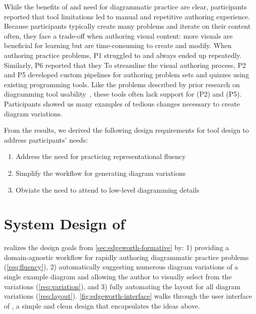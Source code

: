 While the benefits of and need for diagrammatic practice are clear, participants reported that tool limitations led to manual and repetitive authoring experience. Because participants typically create many problems and iterate on their content often, they face a trade-off when authoring visual content: more visuals are beneficial for learning but are time-consuming to create and modify. When authoring practice problems, P1 struggled to  and always ended up  repeatedly. Similarly, P6 reported that they  To streamline the visual authoring process, P2 and P5 developed custom pipelines for authoring problem sets and quizzes using existing programming tools. Like the problems described by prior research on diagramming tool usability~\cite{naturalDiagramming}, these tools often lack support for  (P2) and  (P5). Participants showed us many examples of tedious changes necessary to create diagram variations.

From the results, we derived the following design requirements for tool design to address participants' needs:

\begin{enumerate}[label=\textbf{D\arabic*}]
    \item\label{req:fluency} Address the need for practicing representational fluency
    \item\label{req:variation} Simplify the workflow for generating diagram variations
    \item\label{req:layout} Obviate the need to attend to low-level diagramming details
\end{enumerate}



\section{System Design of \Edgeworth}
\label{sec:edgeworth-system-design}


\Edgeworth realizes the design goals from \cref{sec:edgeworth-formative} by: 1) providing a domain-agnostic workflow for rapidly authoring diagrammatic practice problems (\ref{req:fluency}), 2) automatically suggesting numerous diagram variations of a single example diagram and allowing the author to visually select from the variations (\ref{req:variation}), and 3) fully automating the layout for all diagram variations (\ref{req:layout}). \cref{fig:edgeworth-interface} walks through the user interface of \Edgeworth, a simple and clean design that encapsulates the ideas above.

